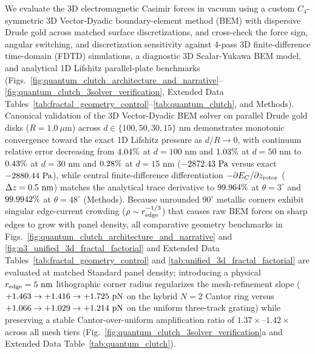 \documentclass[pdflatex,sn-nature]{sn-jnl}
\DeclareRobustCommand{\roundtwo}[1]{\fpeval{round(#1,2)}}
\DeclareRobustCommand{\roundthree}[1]{\fpeval{round(#1,3)}}
\DeclareRobustCommand{\roundfour}[1]{\fpeval{round(#1,4)}}
\begin{document}
We evaluate the 3D electromagnetic Casimir forces in vacuum using a custom $C_4$-symmetric 3D Vector-Dyadic boundary-element method (BEM) with dispersive Drude gold across matched surface discretizations, and cross-check the force sign, angular switching, and discretization sensitivity against 4-pass 3D finite-difference time-domain (FDTD) simulations, a diagnostic 3D Scalar-Yukawa BEM model, and analytical 1D Lifshitz parallel-plate benchmarks\cite{rodriguez2009pra,oskooi2010,rodriguez2011,reid2013pra} (Figs.~\ref{fig:quantum_clutch_architecture_and_narrative}--\ref{fig:quantum_clutch_3solver_verification}, Extended Data Tables~\ref{tab:fractal_geometry_control}--\ref{tab:quantum_clutch}, and Methods). Canonical validation of the 3D Vector-Dyadic BEM solver on parallel Drude gold disks ($R = 1.0\ \mu\text{m}$) across $d \in \{100, 50, 30, 15\}\text{ nm}$ demonstrates monotonic convergence toward the exact 1D Lifshitz pressure as $d/R \to 0$, with continuum relative error decreasing from $\roundtwo{\BemValPlateRelErrContinuumDonezerozeronmPct}\%$ at $d=100\text{ nm}$ and $\roundtwo{\BemValPlateRelErrContinuumDfivezeronmPct}\%$ at $d=50\text{ nm}$ to $\roundtwo{\BemValPlateRelErrContinuumDthreezeronmPct}\%$ at $d=30\text{ nm}$ and $\roundtwo{\BemValPlateRelErrContinuumDonefivenmPct}\%$ at $d=15\text{ nm}$ ($\roundtwo{\BemValPlateBemContinuumDonefivenmPa}\text{ Pa}$ versus exact $\roundtwo{\BemValLifshitzExactDonefivenmPa}\text{ Pa}$), while central finite-difference differentiation $-\partial E_C/\partial z_{\rm rotor}$ ($\Delta z = 0.5{}\text{ nm}$) matches the analytical trace derivative to $\roundthree{\BemValCantorThetathreeTraceVsFdAgreementPct}\%$ at $\theta=3^\circ$ and $\roundfour{\BemValCantorThetafoureightTraceVsFdAgreementPct}\%$ at $\theta=48^\circ$ (Methods). Because unrounded $90^\circ$ metallic corners exhibit singular edge-current crowding ($\rho \sim r_{\rm edge}^{-1/3}$) that causes raw BEM forces on sharp edges to grow with panel density, all comparative geometry benchmarks in Figs.~\ref{fig:quantum_clutch_architecture_and_narrative} and \ref{fig:n3_unified_3d_fractal_factorial} and Extended Data Tables~\ref{tab:fractal_geometry_control} and \ref{tab:unified_3d_fractal_factorial} are evaluated at matched Standard panel density; introducing a physical $r_{\rm edge} = 5\text{ nm}$ lithographic corner radius regularizes the mesh-refinement slope ($+\roundthree{\CantorNtwoHybridrzBemRfiveNmStdFZPn} \to +\roundthree{\CantorNtwoHybridrzBemRfiveNmHighFZPn} \to +\roundthree{\CantorNtwoHybridrzBemRfiveNmUltraFZPn}\text{ pN}$ on the hybrid $N=2$ Cantor ring versus $+\roundthree{\CtrlUniformperiodicBemRfiveNmStdFZPn} \to +\roundthree{\CtrlUniformperiodicBemRfiveNmHighFZPn} \to +\roundthree{\CtrlUniformperiodicBemRfiveNmUltraFZPn}\text{ pN}$ on the uniform three-track grating) while preserving a stable Cantor-over-uniform amplification ratio of $1.37\times\text{--}1.42\times$ across all mesh tiers (Fig.~\ref{fig:quantum_clutch_3solver_verification}a and Extended Data Table~\ref{tab:quantum_clutch}).
\end{document}
